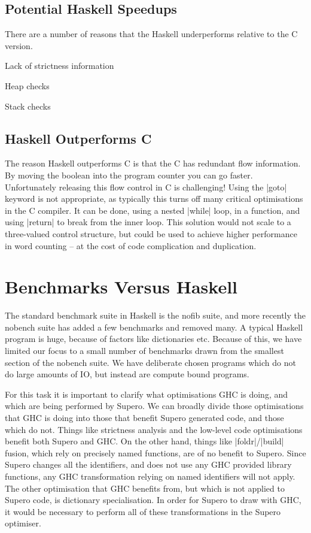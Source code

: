 \documentclass{llncs}
\begin{document}
\subsection{Potential Haskell Speedups}

There are a number of reasons that the Haskell underperforms relative to the C version.

Lack of strictness information

Heap checks

Stack checks

\subsection{Haskell Outperforms C}

The reason Haskell outperforms C is that the C has redundant flow information. By moving the boolean into the program counter you can go faster. Unfortunately releasing this flow control in C is challenging! Using the |goto| keyword is not appropriate, as typically this turns off many critical optimisations in the C compiler. It can be done, using a nested |while| loop, in a function, and using |return| to break from the inner loop. This solution would not scale to a three-valued control structure, but could be used to achieve higher performance in word counting -- at the cost of code complication and duplication.

\section{Benchmarks Versus Haskell}

The standard benchmark suite in Haskell is the nofib suite, and more recently the nobench suite has added a few benchmarks and removed many. A typical Haskell program is huge, because of factors like dictionaries etc. Because of this, we have limited our focus to a small number of benchmarks drawn from the smallest section of the nobench suite. We have deliberate chosen programs which do not do large amounts of IO, but instead are compute bound programs.

For this task it is important to clarify what optimisations GHC is doing, and which are being performed by Supero. We can broadly divide those optimisations that GHC is doing into those that benefit Supero generated code, and those which do not. Things like strictness analysis and the low-level code optimisations benefit both Supero and GHC. On the other hand, things like |foldr|/|build| fusion, which rely on precisely named functions, are of no benefit to Supero. Since Supero changes all the identifiers, and does not use any GHC provided library functions, any GHC transformation relying on named identifiers will not apply. The other optimisation that GHC benefits from, but which is not applied to Supero code, is dictionary specialisation. In order for Supero to draw with GHC, it would be necessary to perform all of these transformations in the Supero optimiser.
\end{document}

